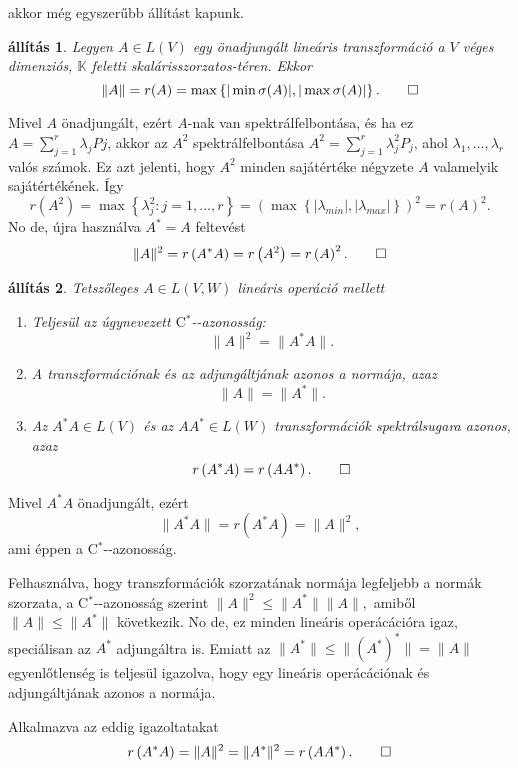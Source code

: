 \documentclass[9pt, a4paper, showtrims]{memoir}
\makeatletter
\renewenvironment{proof}[1][\proofname]
    {\par\pushQED{\qed}%
    \normalfont \topsep6\p@\@plus6\p@\relax
    \trivlist
    \item[\hskip\labelsep
        \itshape
    #1\@addpunct{:}]\ignorespaces}
    {\popQED\endtrivlist\@endpefalse}
\theoremstyle{plain}
\newtheorem{proposition}{állítás}[chapter]
\theoremstyle{remark}
\theoremstyle{definition}
\newcommand{\Star}[1]{#1\ensuremath{^*}\kern-\scriptspace}
\newcommand{\CStar}{\Star{\ensuremath{\mathrm{C}}}}
\makeatother
\begin{document}
akkor még egyszerűbb állítást kapunk.
\begin{proposition}
	Legyen $A\in L\left( V \right)$ egy önadjungált lineáris transzformáció a
	$V$ véges dimenziós, $\mathbb{K}$ feletti ska\-lá\-ris\-szor\-za\-tos-té\-ren.
	Ekkor
	\[
		\|A\|
		=
		r(A)
		=
		\max\left\{ |\min\sigma(A)|,|\max\sigma(A)| \right\}.
		\qedhere
	\]
\end{proposition}
\begin{proof}
	Mivel $A$ önadjungált,
	ezért $A$-nak van spektrálfelbontása, és ha ez $A=\sum_{j=1}^r\lambda_jPj$,
	akkor az $A^2$ spektrálfelbontása $A^2=\sum_{j=1}^r\lambda_j^2P_j$,
	ahol $\lambda_1,\ldots,\lambda_r$ valós számok.
	Ez azt jelenti, hogy $A^2$ minden sajátértéke négyzete $A$ valamelyik sajátértékének.
	Így
	\[
		r\left( A^2 \right)
		=
		\max\left\{ \lambda_j^2:j=1,\ldots,r \right\}
		=
		\left(
		\max\left\{ |\lambda_{min}|,|\lambda_{max}| \right\}
		\right)^2
		=
		r\left( A \right)^2.
	\]
	No de, újra használva $A^\ast=A$ feltevést
	\[
		\|A\|^2
		=
		r\left( A^\ast A \right)
		=
		r\left( A^2 \right)
		=
		r\left( A \right)^2.
		\qedhere
	\]
\end{proof}
\begin{proposition}
	Tetszőleges $A\in L\left( V,W \right)$ lineáris operáció mellett
	\begin{enumerate}
		\item Teljesül az úgynevezett
		      \emph{\CStar-azonosság}\index{Ccsillag@\CStar-azonosság}:
		      \[
			      \|A\|^2=\|A^\ast A\|.
		      \]
		\item A transzformációnak és az adjungáltjának azonos a normája, azaz
		      \[
			      \|A\|
			      =
			      \|A^\ast\|.
		      \]
		\item Az $A^\ast A\in L\left( V \right)$ és az $AA^\ast\in L\left( W \right)$
		      transzformációk spektrálsugara azonos, azaz
		      \[
			      r\left( A^\ast A \right)=r\left( AA^\ast \right).
			      \qedhere
		      \]
	\end{enumerate}
\end{proposition}
\begin{proof}
	Mivel $A^\ast A$ önadjungált, ezért
	\[
		\|A^\ast A\|=r\left(A^\ast A  \right)=\|A\|^2,
	\]
	ami éppen a \CStar-azonosság.

	Felhasználva, hogy transzformációk szorzatának normája legfeljebb a normák szorzata,
	a \CStar-azonosság szerint
	\begin{math}
		\|A\|^2
		\leq
		\|A^\ast\|\|A\|,
	\end{math}
	amiből $\|A\|\leq\|A^\ast\|$ következik.
	No de, ez minden lineáris operácációra igaz,
	speciálisan az $A^\ast$ adjungáltra is.
	Emiatt az
	\begin{math}
		\|A^\ast\|
		\leq
		\|(A^\ast)^\ast\|
		=
		\|A\|
	\end{math}
	egyenlőtlenség is teljesül igazolva,
	hogy egy lineáris operácációnak és adjungáltjának azonos a normája.

	Alkalmazva az eddig igazoltatakat
	\[
		r\left( A^\ast A \right)
		=
		\|A\|^2
		=
		\|A^\ast\|^2
		=
		r\left( AA^\ast \right).
		\qedhere
	\]
\end{proof}
\end{document}
